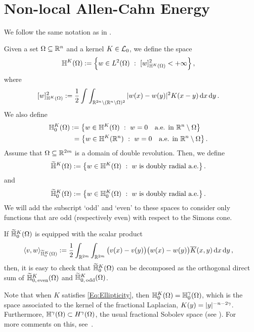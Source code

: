 \section{Non-local Allen-Cahn Energy}
\label{Sec:Nonlocal_AllenCahn_Energy}

We follow the same notation as in \cite{CozziPassalacqua}.


\begin{definition}
\label{Def:FunctionalSpaceHK}
Given a set $\Omega \subseteq \mathbb{R}^n$ and a kernel $K \in \mathcal{L}_0$, we define the space
$$
\mathbb{H}^K(\Omega) := \left \{ w \in L^2(\Omega) \ : \ [w]^2_{\mathbb{H}^K(\Omega)} < + \infty \right \},
$$
where
$$
[w]^2_{\mathbb{H}^K(\Omega)} := \dfrac{1}{2}\int\int_{\mathbb{R}^{2n} \setminus (\mathbb{R}^n\setminus\Omega)^2} |w(x) - w(y)|^2 K(x-y) \,\mathrm{d} x \,\mathrm{d} y\,.
$$
We also define
\begin{align*}
	\mathbb{H}^K_0(\Omega) &:= \left \{ w \in \mathbb{H}^K(\Omega) \ : \  w = 0 \quad \textrm{a.e. in } \mathbb{R}^n \setminus \Omega \right \} \\
	&\ = \left \{ w \in \mathbb{H}^K(\mathbb{R}^n) \ : \  w = 0 \quad \textrm{a.e. in } \mathbb{R}^n \setminus \Omega \right \}.
\end{align*}
Assume that $\Omega \subseteq \mathbb{R}^{2m}$ is a domain of double revolution. Then, we define
$$
\widetilde{\mathbb{H}}^K(\Omega) := \left \{ w \in \mathbb{H}^K(\Omega) \ : \ w \textrm{ is doubly radial a.e.} \right \}.
$$
and
$$
\widetilde{\mathbb{H}}^K_0(\Omega) := \left \{ w \in \mathbb{H}^K_0(\Omega) \ : \ w \textrm{ is doubly radial a.e.} \right \}.
$$
We will add the subscript `odd' and `even' to these spaces to consider only functions that are odd (respectively even) with respect to the Simons cone.
\end{definition}

\begin{remark}
\label{Remark:DecompositionHK}
If $\widetilde{\mathbb{H}}^K_0(\Omega)$ is equipped with the scalar product
$$
\langle v,w \rangle_{\widetilde{\mathbb{H}}^K_0(\Omega)} := \dfrac{1}{2}\int_{\mathbb{R}^{2m}} \int_{\mathbb{R}^{2m}}  \big(v(x) - v(y)\big)\big(w(x) - w(y)\big) \overline{K} (x,y) \,\mathrm{d} x \,\mathrm{d} y\,,
$$
then, it is easy to check that $\widetilde{\mathbb{H}}^K_0(\Omega)$ can be decomposed as the orthogonal
direct sum of $\widetilde{\mathbb{H}}^K_{0,\, \mathrm{even}}(\Omega)$ and $\widetilde{\mathbb{H}}^K_{0,\,
\mathrm{odd}}(\Omega)$.
\end{remark}

Note that when $K$ satisfies \eqref{Eq:Ellipticity}, then $\mathbb{H}^K_0 (\Omega) = \mathbb{H}^\gamma_0 (\Omega)$,
which is the space associated to the kernel of the fractional Laplacian, $K(y) = |y|^{-n-2\gamma}$.
Furthermore, $\mathbb{H}^\gamma(\Omega) \subset H^\gamma(\Omega)$, the usual fractional Sobolev space (see
\cite{HitchhikerGuide}).  For more comments on this, see~\cite{CozziPassalacqua}.

